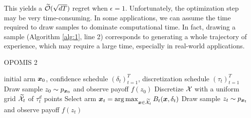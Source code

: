\documentclass{article}
\makeatletter
\DeclareRobustCommand{\algoname}{OPOMIS\@\xspace}
\makeatother
\begin{document}
%
This yields a $\widetilde{\mathcal{O}}(\sqrt{dT})$ regret when $\epsilon=1$. Unfortunately, the optimization step may be very time-consuming. In some applications, we can assume the time required to draw samples to dominate computational time. In fact, drawing a sample (Algorithm \ref{alg:1}, line 2) corresponds to generating a whole trajectory of experience, which may require a large time, especially in real-world applications.

\begin{algorithm}[t]
	\caption{\algoname2}
	\label{alg:2}
	\begin{algorithmic}[1]
		 initial arm $\boldsymbol{x}_0$, confidence schedule $(\delta_t)_{t=1}^T$, discretization schedule $(\tau_t)_{t=1}^T$
		\STATE Draw sample $z_0\sim p_{\boldsymbol{x}_0}$ and observe payoff $f(z_0)$
		\STATE Discretize $\mathcal{X}$ with a uniform grid $\widetilde{\mathcal{X}}_t$ of $\tau_t^d$ points
		\STATE Select arm $\boldsymbol{x}_t = \arg\max_{\boldsymbol{x}\in\widetilde{\mathcal{X}}_t}B_t(\boldsymbol{x},\delta_t)$
		\STATE Draw sample $z_t\sim p_{\boldsymbol{x}_t}$ and observe payoff $f(z_t)$
		\ENDFOR
	\end{algorithmic}
\end{algorithm}
%
\end{document}
